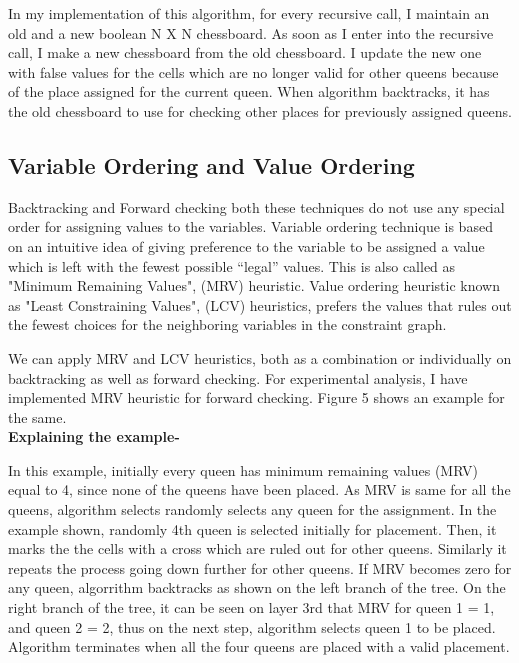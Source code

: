 \documentclass[conference]{IEEEtran}
\begin{document}
In my implementation of this algorithm, for every recursive call, I maintain an old and a new boolean N X N chessboard. As soon as I enter into the recursive call, I make a new chessboard from the old chessboard. I update the new one with false values for the cells which are no longer valid for other queens because of the place assigned for the current queen. When algorithm backtracks, it has the old chessboard to use for checking other places for previously assigned queens.

\subsection{Variable Ordering and Value Ordering}

Backtracking and Forward checking both these techniques do not use any special order for assigning values to the variables. Variable ordering technique is based on an intuitive idea of giving preference to the variable to be assigned a value which is left with the fewest possible “legal” values. This is also called as "Minimum Remaining Values", (MRV) heuristic. Value ordering heuristic known as "Least Constraining Values", (LCV) heuristics,  prefers the values that rules out the fewest choices for the neighboring variables in the constraint graph.

We can apply MRV and LCV heuristics, both as a combination or individually on backtracking as well as forward checking. For experimental analysis, I have implemented MRV heuristic for forward checking. Figure  5 shows an example for the same. \\

\textbf {Explaining the example- }

In this example, initially every queen has minimum remaining values (MRV) equal to 4, since none of the queens have been placed. As MRV is same for all the queens, algorithm selects randomly selects any queen for the assignment. In the example shown, randomly 4th queen is selected initially for placement. Then, it marks the the cells with a cross which are ruled out for other queens. Similarly it repeats the process going down further for other queens. If MRV becomes zero for any queen, algorrithm backtracks as shown on the left branch of the tree. On the right branch of the tree, it can be seen on layer 3rd that MRV for queen 1 = 1, and queen 2 = 2, thus on the next step, algorithm selects queen 1 to be placed.
\\Algorithm terminates when all the four queens are placed with a valid placement. 
\end{document}
